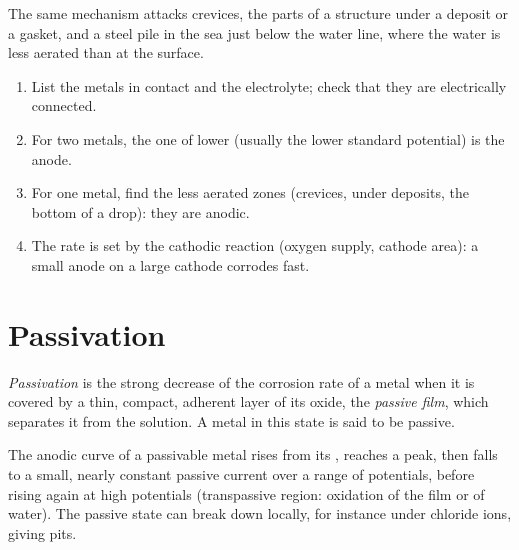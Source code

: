 The same mechanism attacks crevices, the parts of a structure under a deposit
or a gasket, and a steel pile in the sea just below the water line, where
the water is less aerated than at the surface.

\begin{method}\label{met:b2:corrosion:diagnose}
\begin{enumerate}
  \item List the metals in contact and the electrolyte; check that they are
        electrically connected.
  \item For two metals, the one of lower  (usually the
        lower standard potential) is the anode.
  \item For one metal, find the less aerated zones (crevices, under deposits,
        the bottom of a drop): they are anodic.
  \item The rate is set by the cathodic reaction (oxygen supply, cathode area):
        a small anode on a large cathode corrodes fast.
\end{enumerate}
\end{method}

\section{Passivation}

\begin{definition}[Passivation]\label{def:b2:corrosion:passivation}
\emph{Passivation} is the strong decrease of the corrosion
rate of a metal when it is covered by a thin, compact, adherent layer of its
oxide, the \emph{passive film}, which separates it from the
solution. A metal in this state is said to be passive.
\end{definition}

\begin{proposition}\label{prop:b2:corrosion:passivity}
The anodic curve of a passivable metal rises from its ,
reaches a peak, then falls to a small, nearly constant passive current over a
range of potentials, before rising again at high potentials (transpassive
region: oxidation of the film or of water). The passive state can break down
locally, for instance under chloride ions, giving pits.
\end{proposition}

